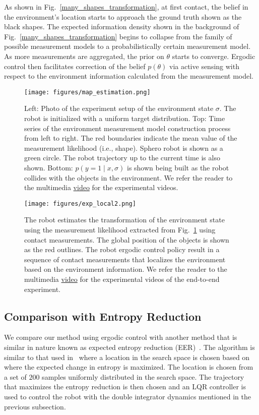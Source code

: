 \documentclass[conference]{IEEEtran}
\begin{document}
As shown in Fig.~\ref{many_shapes_transformation}, at first contact, the belief in the environment's location starts to approach the ground truth shown as the black shapes. 
The expected information density shown in the background of Fig.~\ref{many_shapes_transformation} begins to collapse from the family of possible measurement models to a probabilistically certain measurement model.
As more measurements are aggregated, the prior on $\theta$ starts to converge.
Ergodic control then facilitates correction of the belief $p(\theta)$ via active sensing with respect to the environment information calculated from the measurement model.




\begin{figure*}[th!]
\centering
\texttt{[image: figures/map\_estimation.png]} 
\caption{Left: Photo of the experiment setup of the environment state $\sigma$. The robot is initialized with a uniform target distribution. Top: Time series of the environment measurement model construction process from left to right. The red boundaries indicate the mean value of the measurement likelihood (i.e., shape). Sphero robot is shown as a green circle. The robot trajectory up to the current time is also shown. Bottom: $p(y=1 \mid x, \sigma)$ is shown being built as the robot collides with the objects in the environment.
We refer the reader to the multimedia \href{https://youtu.be/yKVlo_kE0cw}{video} for the experimental videos.
} 
\label{map_estimation}
\end{figure*}

 \begin{figure*}[ht!]
\centering
\texttt{[image: figures/exp\_local2.png]} 
\caption{The robot estimates the transformation of the environment state using the measurement likelihood extracted from Fig.~\ref{map_estimation} using contact measurements. The global position of the objects is shown as the red outlines. The robot ergodic control policy result in a sequence of contact measurements that localizes the environment based on the environment information. We refer the reader to the multimedia \href{https://youtu.be/yKVlo_kE0cw}{video} for the experimental videos of the end-to-end experiment.
 }
\label{map_transformation}
\end{figure*}


\subsection{Comparison with Entropy Reduction}
\label{sec:comparison_gEER}
We compare our method using ergodic control with another method that is similar in nature known as expected entropy reduction (EER)~\cite{miller2015optimalrange, miller2016ergodic, abrahamRAL17}.
The algorithm is similar to that used in~\cite{kreucher2005sensor, fox1998active,feder1999adaptive, kreucher2007multiplatform} where a location in the search space is chosen based on where the expected change in entropy is maximized.
The location is chosen from a set of $200$ samples uniformly distributed in the search space. 
The trajectory that maximizes the entropy reduction is then chosen and an LQR controller is used to control the robot with the double integrator dynamics mentioned in the previous subsection. 
\end{document}
